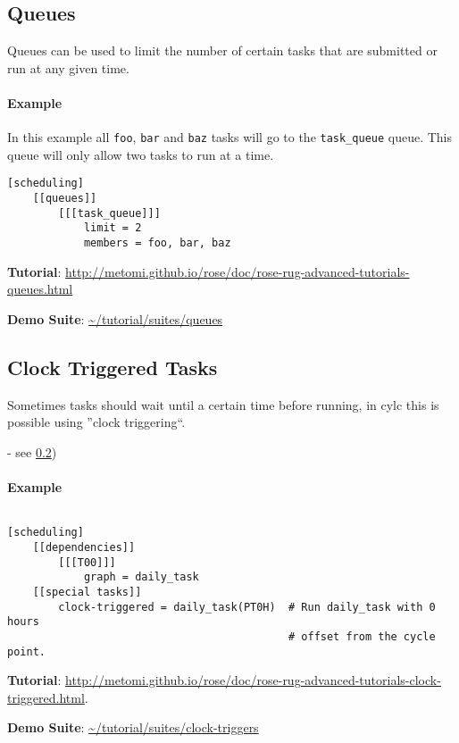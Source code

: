 \subsection{Queues}

Queues can be used to limit the number of certain tasks that are submitted or
run at any given time.

\paragraph*{Example}

In this example all \lstinline{foo}, \lstinline{bar} and \lstinline{baz} tasks
will go to the \lstinline{task_queue} queue. This queue will only allow two
tasks to run at a time.

\begin{lstlisting}
[scheduling]
    [[queues]]
        [[[task_queue]]]
            limit = 2
            members = foo, bar, baz
\end{lstlisting}

\begin{shaded*}
\textbf{Tutorial}: \url{http://metomi.github.io/rose/doc/rose-rug-advanced-tutorials-queues.html}

\textbf{Demo Suite}:
\url{~/tutorial/suites/queues}
\end{shaded*}

\subsection{Clock Triggered Tasks}
\label{Clock Triggered Tasks}

Sometimes tasks should wait until a certain time before running, in cylc this
is possible using ''clock triggering``.


- see \ref{Clock Triggered Tasks}) 
\paragraph*{Example} $ $

\begin{lstlisting}
[scheduling]
    [[dependencies]]
        [[[T00]]]
            graph = daily_task
    [[special tasks]]
        clock-triggered = daily_task(PT0H)  # Run daily_task with 0 hours
                                            # offset from the cycle point.
\end{lstlisting}

\begin{shaded*}
\textbf{Tutorial}: \url{http://metomi.github.io/rose/doc/rose-rug-advanced-tutorials-clock-triggered.html}.

\textbf{Demo Suite}:
\url{~/tutorial/suites/clock-triggers}
\end{shaded*}

